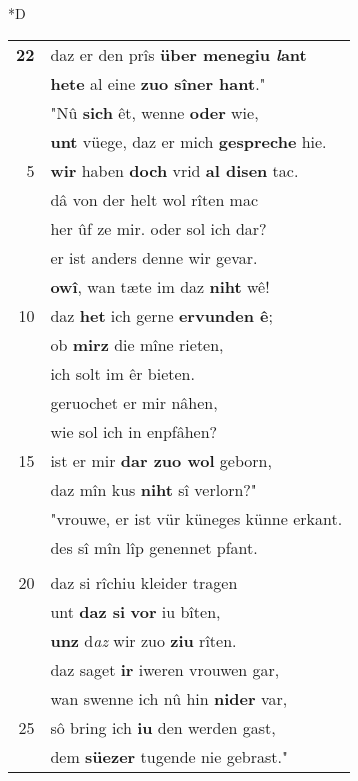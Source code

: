 \documentclass[8pt,a4paper,notitlepage]{article}
\begin{document}
\begin{table}[ht]
\begin{minipage}[t]{0.5\linewidth}
\small
\begin{center}*D
\end{center}
\begin{tabular}{rl}
\textbf{22} & daz er den prîs \textbf{über menegiu \textit{l}ant}\\ 
 & \textbf{hete} al eine \textbf{zuo sîner hant}."\\ 
 & "Nû \textbf{sich} êt, wenne \textbf{oder} wie,\\ 
 & \textbf{unt} vüege, daz er mich \textbf{gespreche} hie.\\ 
5 & \textbf{wir} haben \textbf{doch} vrid \textbf{al disen} tac.\\ 
 & dâ von der helt wol rîten mac\\ 
 & her ûf ze mir. oder sol ich dar?\\ 
 & er ist anders denne wir gevar.\\ 
 & \textbf{owî}, wan tæte im daz \textbf{niht} wê!\\ 
10 & daz \textbf{het} ich gerne \textbf{ervunden ê};\\ 
 & ob \textbf{mirz} die mîne rieten,\\ 
 & ich solt im êr bieten.\\ 
 & geruochet er mir nâhen,\\ 
 & wie sol ich in enpfâhen?\\ 
15 & ist er mir \textbf{dar zuo wol} geborn,\\ 
 & daz mîn kus \textbf{niht} sî verlorn?"\\ 
 & "vrouwe, er ist vür küneges künne erkant.\\ 
 & des sî mîn lîp genennet pfant.\\ 
 & \textbf{\begin{large}V\end{large}rouwe}, ich wil iwern vürsten sagen,\\ 
20 & daz si rîchiu kleider tragen\\ 
 & unt \textbf{daz si} \textbf{vor} iu bîten,\\ 
 & \textbf{unz} d\textit{az} wir zuo \textbf{ziu} rîten.\\ 
 & daz saget \textbf{ir} iweren vrouwen gar,\\ 
 & wan swenne ich nû hin \textbf{nider} var,\\ 
25 & sô bring ich \textbf{iu} den werden gast,\\ 
 & dem \textbf{süezer} tugende nie gebrast."\\ 

\end{tabular}
\end{minipage}
\end{table}
\end{document}
